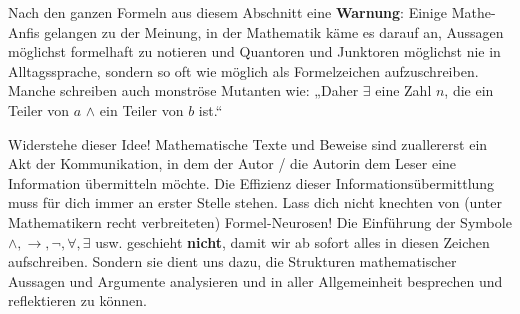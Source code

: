 \begin{bem}
    Nach den ganzen Formeln aus diesem Abschnitt eine \textbf{Warnung}: Einige Mathe-Anfis gelangen zu der Meinung, in der Mathematik käme es darauf an, Aussagen möglichst formelhaft zu notieren und Quantoren und Junktoren möglichst nie in Alltagssprache, sondern so oft wie möglich als Formelzeichen aufzuschreiben. Manche schreiben auch monströse Mutanten wie: „Daher $\exists$ eine Zahl $n$, die ein Teiler von $a$ $\land$ ein Teiler von $b$ ist.“
    
    Widerstehe dieser Idee! Mathematische Texte und Beweise sind zuallererst ein Akt der Kommunikation, in dem der Autor / die Autorin dem Leser eine Information übermitteln möchte. Die Effizienz dieser Informationsübermittlung muss für dich immer an erster Stelle stehen. Lass dich nicht knechten von (unter Mathematikern recht verbreiteten) Formel-Neurosen! Die Einführung der Symbole $\land,\to,\neg,\forall,\exists$ usw. geschieht \textbf{nicht}, damit wir ab sofort alles in diesen Zeichen aufschreiben. Sondern sie dient uns dazu, die Strukturen mathematischer Aussagen und Argumente analysieren und in aller Allgemeinheit besprechen und reflektieren zu können.
\end{bem}


